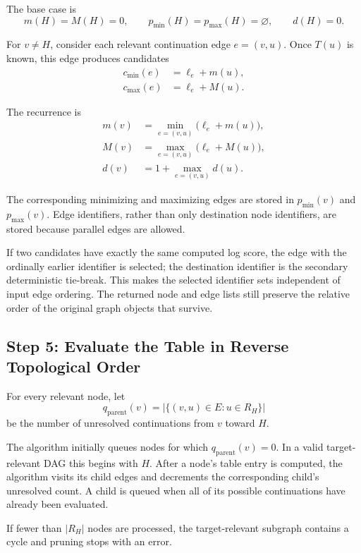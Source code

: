 \documentclass[11pt]{article}
\begin{document}
The base case is
\[
    m(H)=M(H)=0,
    \qquad
    p_{\min}(H)=p_{\max}(H)=\varnothing,
    \qquad
    d(H)=0.
\]

For \(v\neq H\), consider each relevant continuation edge
\(e=(v,u)\).  Once \(T(u)\) is known, this edge produces candidates
\begin{align*}
    c_{\min}(e) &= \ell_e + m(u),\\
    c_{\max}(e) &= \ell_e + M(u).
\end{align*}

The recurrence is
\begin{align*}
    m(v)
      &= \min_{e=(v,u)}\bigl(\ell_e+m(u)\bigr),\\
    M(v)
      &= \max_{e=(v,u)}\bigl(\ell_e+M(u)\bigr),\\
    d(v)
      &= 1+\max_{e=(v,u)}d(u).
\end{align*}

The corresponding minimizing and maximizing edges are stored in
\(p_{\min}(v)\) and \(p_{\max}(v)\).  Edge identifiers, rather than only
destination node identifiers, are stored because parallel edges are allowed.

If two candidates have exactly the same computed log score, the edge with the
ordinally earlier identifier is selected; the destination identifier is the
secondary deterministic tie-break.  This makes the selected identifier sets
independent of input edge ordering.  The returned node and edge lists still
preserve the relative order of the original graph objects that survive.

\subsection{Step 5: Evaluate the Table in Reverse Topological Order}

For every relevant node, let
\[
    q_{\mathrm{parent}}(v)
      = \left|\{(v,u)\in E : u\in R_H\}\right|
\]
be the number of unresolved continuations from \(v\) toward \(H\).

The algorithm initially queues nodes for which
\(q_{\mathrm{parent}}(v)=0\).  In a valid target-relevant DAG this begins with
\(H\).  After a node's table entry is computed, the algorithm visits its child
edges and decrements the corresponding child's unresolved count.  A child is
queued when all of its possible continuations have already been evaluated.

If fewer than \(|R_H|\) nodes are processed, the target-relevant subgraph
contains a cycle and pruning stops with an error.
\end{document}
